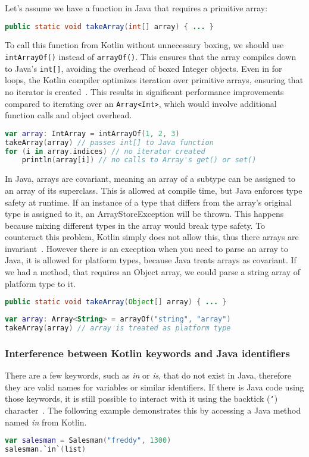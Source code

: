 \documentclass[a4paper,11pt]{article}
\begin{document}
Let's assume we have a function in Java that requires a primitive array:
\begin{lstlisting}[language=Java]
public static void takeArray(int[] array) { ... }
\end{lstlisting}
To call this function from Kotlin without unnecessary boxing, we should use \texttt{intArrayOf()} instead of \texttt{arrayOf()}. This ensures that the array compiles down to Java's \texttt{int[]}, avoiding the overhead of boxed Integer objects. Even in for loops, the Kotlin compiler optimizes iteration over primitive arrays, ensuring that no iterator is created~\cite{interop-arrays}. This results in significant performance improvements compared to iterating over an \texttt{Array<Int>}, which would involve additional function calls and object overhead.
\begin{lstlisting}[language=Kotlin]
var array: IntArray = intArrayOf(1, 2, 3)
takeArray(array) // passes int[] to Java function
for (i in array.indices) // no iterator created
    println(array[i]) // no calls to Array's get() or set()
\end{lstlisting}
In Java, arrays are covariant, meaning an array of a subtype can be assigned to an array of its superclass. This is allowed at compile time, but Java enforces type safety at runtime. If an instance of a type that differs from the array's original type is assigned to it, an ArrayStoreException will be thrown. This happens because mixing different types in the array would break type safety. To counteract this problem, Kotlin simply does not allow this, thus there arrays are invariant~\cite{interop-arrays}. However there is an exception when you need to parse an array to Java, it is allowed for platform types, because Java treats arrays as covariant. If we had a method, that requires an Object array, we could parse a string array of platform type to it.
\begin{lstlisting}[language=Java]
public static void takeArray(Object[] array) { ... }
\end{lstlisting}
\begin{lstlisting}[language=Kotlin]
var array: Array<String> = arrayOf("string", "array")
takeArray(array) // array is treated as platform type
\end{lstlisting}

\subsubsection{Interference between Kotlin keywords and Java identifiers}
There are a few keywords, such as \textit{in} or \textit{is}, that do not exist in Java, therefore they are valid names for variables or similar identifiers. If there is Java code using those keywords, it is still possible to interact with it using the backtick (\texttt{`}) character~\cite{interop-escaping-identifiers}. The following example demonstrates this by accessing a Java method named \textit{in} from Kotlin.
\begin{lstlisting}[language=Kotlin]
var salesman = Salesman("freddy", 1300)
salesman.`in`(list)
\end{lstlisting}
\end{document}
